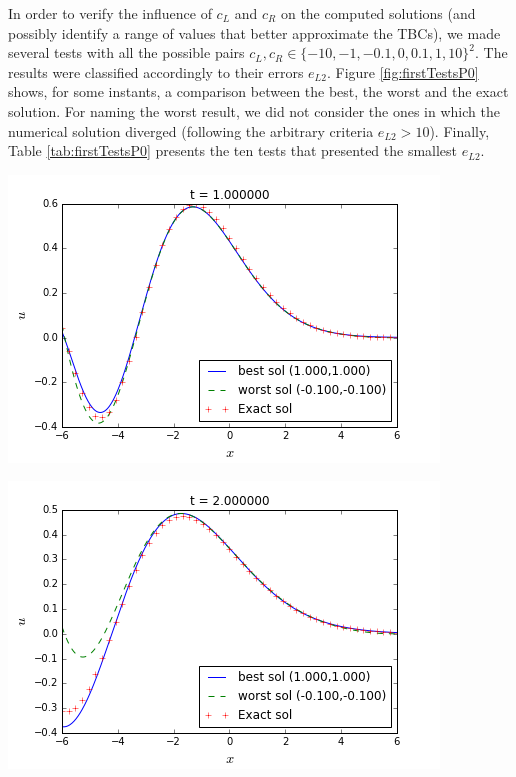 \indent In order to verify the influence of $c_L$ and $c_R$ on the computed solutions (and possibly identify a range of values that better approximate the TBCs), we made several tests with all the possible pairs $c_L,c_R \in \{-10,-1,-0.1,0,0.1,1,10\}^2$. The results were classified accordingly to their errors $e_{L2}$. Figure \ref{fig:firstTestsP0} shows, for some instants, a comparison between the best, the worst and the exact solution. For naming the worst result, we did not consider the ones in which the numerical solution diverged (following the arbitrary criteria $e_{L2} > 10$).  Finally,  Table \ref{tab:firstTestsP0} presents the ten tests that presented the smallest $e_{L2}$.

\begingroup
\noindent
\begin{minipage}[t]{.5\linewidth}
  \includegraphics[scale=.375]{Fig1a.png}
\end{minipage}
\hfill
\begin{minipage}[t]{.5\linewidth}
	\includegraphics[scale=.375]{Fig1b.png}
\end{minipage}
